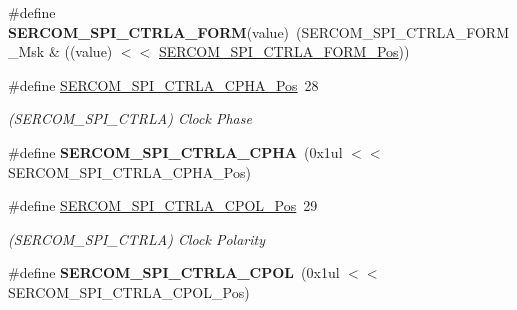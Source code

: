 \begin{DoxyCompactItemize}
\item 
\hypertarget{group___s_a_m_l21___s_e_r_c_o_m_ga4a57d119f040e0061f3c04aa233caace}{}\#define {\bfseries S\+E\+R\+C\+O\+M\+\_\+\+S\+P\+I\+\_\+\+C\+T\+R\+L\+A\+\_\+\+F\+O\+R\+M}(value)~(S\+E\+R\+C\+O\+M\+\_\+\+S\+P\+I\+\_\+\+C\+T\+R\+L\+A\+\_\+\+F\+O\+R\+M\+\_\+\+Msk \& ((value) $<$$<$ \hyperlink{group___s_a_m_l21___s_e_r_c_o_m_ga1442afbea00b3d181e673dfc47f448a5}{S\+E\+R\+C\+O\+M\+\_\+\+S\+P\+I\+\_\+\+C\+T\+R\+L\+A\+\_\+\+F\+O\+R\+M\+\_\+\+Pos}))\label{group___s_a_m_l21___s_e_r_c_o_m_ga4a57d119f040e0061f3c04aa233caace}

\item 
\hypertarget{group___s_a_m_l21___s_e_r_c_o_m_gab3ea80ad57c40f051ee961f3ff130d8e}{}\#define \hyperlink{group___s_a_m_l21___s_e_r_c_o_m_gab3ea80ad57c40f051ee961f3ff130d8e}{S\+E\+R\+C\+O\+M\+\_\+\+S\+P\+I\+\_\+\+C\+T\+R\+L\+A\+\_\+\+C\+P\+H\+A\+\_\+\+Pos}~28\label{group___s_a_m_l21___s_e_r_c_o_m_gab3ea80ad57c40f051ee961f3ff130d8e}

\begin{DoxyCompactList}\small\item\em (S\+E\+R\+C\+O\+M\+\_\+\+S\+P\+I\+\_\+\+C\+T\+R\+L\+A) Clock Phase \end{DoxyCompactList}\item 
\hypertarget{group___s_a_m_l21___s_e_r_c_o_m_ga2d23bc1a96edba02d16a9619e5946bde}{}\#define {\bfseries S\+E\+R\+C\+O\+M\+\_\+\+S\+P\+I\+\_\+\+C\+T\+R\+L\+A\+\_\+\+C\+P\+H\+A}~(0x1ul $<$$<$ S\+E\+R\+C\+O\+M\+\_\+\+S\+P\+I\+\_\+\+C\+T\+R\+L\+A\+\_\+\+C\+P\+H\+A\+\_\+\+Pos)\label{group___s_a_m_l21___s_e_r_c_o_m_ga2d23bc1a96edba02d16a9619e5946bde}

\item 
\hypertarget{group___s_a_m_l21___s_e_r_c_o_m_gab0481726f11f28aa329437f9a6686155}{}\#define \hyperlink{group___s_a_m_l21___s_e_r_c_o_m_gab0481726f11f28aa329437f9a6686155}{S\+E\+R\+C\+O\+M\+\_\+\+S\+P\+I\+\_\+\+C\+T\+R\+L\+A\+\_\+\+C\+P\+O\+L\+\_\+\+Pos}~29\label{group___s_a_m_l21___s_e_r_c_o_m_gab0481726f11f28aa329437f9a6686155}

\begin{DoxyCompactList}\small\item\em (S\+E\+R\+C\+O\+M\+\_\+\+S\+P\+I\+\_\+\+C\+T\+R\+L\+A) Clock Polarity \end{DoxyCompactList}\item 
\hypertarget{group___s_a_m_l21___s_e_r_c_o_m_gac69832b2939b72f91665ad3909bf6855}{}\#define {\bfseries S\+E\+R\+C\+O\+M\+\_\+\+S\+P\+I\+\_\+\+C\+T\+R\+L\+A\+\_\+\+C\+P\+O\+L}~(0x1ul $<$$<$ S\+E\+R\+C\+O\+M\+\_\+\+S\+P\+I\+\_\+\+C\+T\+R\+L\+A\+\_\+\+C\+P\+O\+L\+\_\+\+Pos)\label{group___s_a_m_l21___s_e_r_c_o_m_gac69832b2939b72f91665ad3909bf6855}


\end{DoxyCompactItemize}
